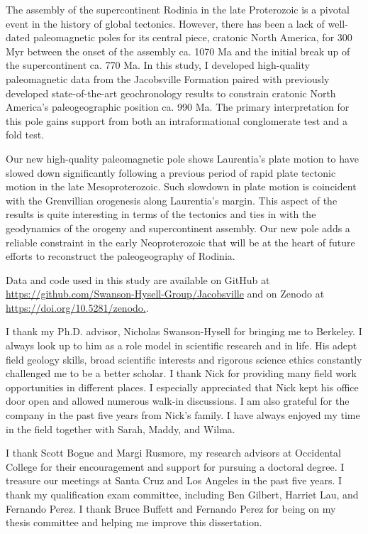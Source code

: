 \documentclass{ucbthesis}
\begin{document}
\begin{frontmatter}
The assembly of the supercontinent Rodinia in the late Proterozoic is a pivotal event in the history of global tectonics. However, there has been a lack of well-dated paleomagnetic poles for its central piece, cratonic North America, for 300 Myr between the onset of the assembly ca. 1070 Ma and the initial break up of the supercontinent ca. 770 Ma. In this study, I developed high-quality paleomagnetic data from the Jacobsville Formation paired with previously developed state-of-the-art geochronology results to constrain cratonic North America's paleogeographic position ca. 990 Ma. The primary interpretation for this pole gains support from both an intraformational conglomerate test and a fold test. 
 
Our new high-quality paleomagnetic pole shows Laurentia's plate motion to have slowed down significantly following a previous period of rapid plate tectonic motion in the late Mesoproterozoic. Such slowdown in plate motion is coincident with the Grenvillian orogenesis along Laurentia's margin. This aspect of the results is quite interesting in terms of the tectonics and ties in with the geodynamics of the orogeny and supercontinent assembly. Our new pole adds a reliable constraint in the early Neoproterozoic that will be at the heart of future efforts to reconstruct the paleogeography of Rodinia.

Data and code used in this study are available on GitHub at \url{https://github.com/Swanson-Hysell-Group/Jacobsville} and on Zenodo at \url{https://doi.org/10.5281/zenodo.}.

\begin{acknowledgements}
I thank my Ph.D. advisor, Nicholas Swanson-Hysell for bringing me to Berkeley. I always look up to him as a role model in scientific research and in life. His adept field geology skills, broad scientific interests and rigorous science ethics constantly challenged me to be a better scholar. I thank Nick for providing many field work opportunities in different places. I especially appreciated that Nick kept his office door open and allowed numerous walk-in discussions. I am also grateful for the company in the past five years from Nick's family. I have always enjoyed my time in the field together with Sarah, Maddy, and Wilma. 

I thank Scott Bogue and Margi Rusmore, my research advisors at Occidental College for their encouragement and support for pursuing a doctoral degree. I treasure our meetings at Santa Cruz and Los Angeles in the past five years. I thank my qualification exam committee, including Ben Gilbert, Harriet Lau, and Fernando Perez. I thank Bruce Buffett and Fernando Perez for being on my thesis committee and helping me improve this dissertation. 


\end{acknowledgements}
\end{frontmatter}
\end{document}

